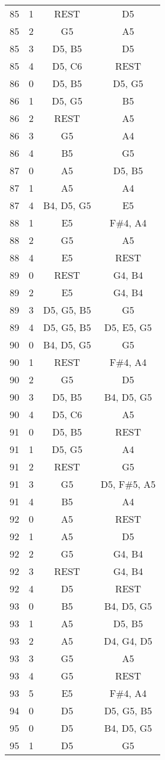 \documentclass{article}
\begin{document}
\begin{longtable}{|c|c|c|c|}
85 & 1 & REST & D5 \\ 
85 & 2 & G5 & A5 \\ 
85 & 3 & D5, B5 & D5 \\ 
85 & 4 & D5, C6 & REST \\ 
\hline
86 & 0 & D5, B5 & D5, G5 \\ 
86 & 1 & D5, G5 & B5 \\ 
86 & 2 & REST & A5 \\ 
86 & 3 & G5 & A4 \\ 
86 & 4 & B5 & G5 \\ 
\hline
87 & 0 & A5 & D5, B5 \\ 
87 & 1 & A5 & A4 \\ 
87 & 4 & B4, D5, G5 & E5 \\ 
\hline
88 & 1 & E5 & F\#4, A4 \\ 
88 & 2 & G5 & A5 \\ 
88 & 4 & E5 & REST \\ 
\hline
89 & 0 & REST & G4, B4 \\ 
89 & 2 & E5 & G4, B4 \\ 
89 & 3 & D5, G5, B5 & G5 \\ 
89 & 4 & D5, G5, B5 & D5, E5, G5 \\ 
\hline
90 & 0 & B4, D5, G5 & G5 \\ 
90 & 1 & REST & F\#4, A4 \\ 
90 & 2 & G5 & D5 \\ 
90 & 3 & D5, B5 & B4, D5, G5 \\ 
90 & 4 & D5, C6 & A5 \\ 
\hline
91 & 0 & D5, B5 & REST \\ 
91 & 1 & D5, G5 & A4 \\ 
91 & 2 & REST & G5 \\ 
91 & 3 & G5 & D5, F\#5, A5 \\ 
91 & 4 & B5 & A4 \\ 
\hline
92 & 0 & A5 & REST \\ 
92 & 1 & A5 & D5 \\ 
92 & 2 & G5 & G4, B4 \\ 
92 & 3 & REST & G4, B4 \\ 
92 & 4 & D5 & REST \\ 
\hline
93 & 0 & B5 & B4, D5, G5 \\ 
93 & 1 & A5 & D5, B5 \\ 
93 & 2 & A5 & D4, G4, D5 \\ 
93 & 3 & G5 & A5 \\ 
93 & 4 & G5 & REST \\ 
93 & 5 & E5 & F\#4, A4 \\ 
\hline
94 & 0 & D5 & D5, G5, B5 \\ 
\hline
95 & 0 & D5 & B4, D5, G5 \\ 
95 & 1 & D5 & G5 \\ 
\hline
\end{longtable}
\end{document}
